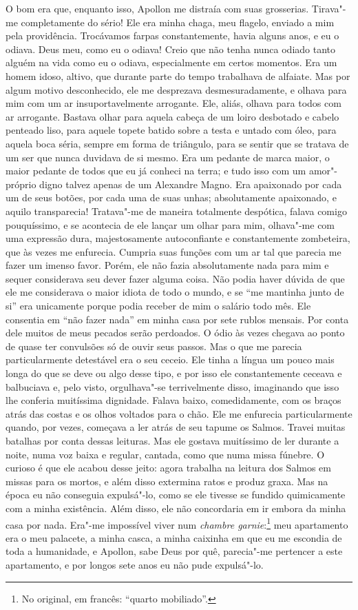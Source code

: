 O bom era que, enquanto isso, Apollon me distraía com suas grosserias.
Tirava"-me completamente do sério! Ele era minha chaga, meu flagelo,
enviado a mim pela providência. Trocávamos farpas constantemente,
havia alguns anos, e eu o odiava. Deus meu, como eu o odiava! Creio que
não tenha nunca odiado tanto alguém na vida como eu o odiava,
especialmente em certos momentos. Era um homem idoso, altivo, que
durante parte do tempo trabalhava de alfaiate. Mas por algum motivo
desconhecido, ele me desprezava desmesuradamente, e olhava para mim com
um ar insuportavelmente arrogante. Ele, aliás, olhava para todos com ar
arrogante. Bastava olhar para aquela cabeça de um loiro desbotado e
cabelo penteado liso, para aquele topete batido sobre a testa e untado
com óleo, para aquela boca séria, sempre em forma de triângulo, para se
sentir que se tratava de um ser que nunca duvidava de si mesmo. Era um
pedante de marca maior, o maior pedante de todos que eu já conheci na
terra; e tudo isso com um amor"-próprio digno talvez apenas de um
Alexandre Magno. Era apaixonado por cada um de seus botões, por cada
uma de suas unhas; absolutamente apaixonado, e aquilo transparecia!
Tratava"-me de maneira totalmente despótica, falava comigo pouquíssimo,
e se acontecia de ele lançar um olhar para mim, olhava"-me com uma
expressão dura, majestosamente autoconfiante e constantemente
zombeteira, que às vezes me enfurecia. Cumpria suas funções com um ar
tal que parecia me fazer um imenso favor. Porém, ele não fazia
absolutamente nada para mim e sequer considerava seu dever fazer alguma
coisa. Não podia haver dúvida de que ele me considerava o maior idiota
de todo o mundo, e se “me mantinha junto de si” era unicamente porque
podia receber de mim o salário todo mês. Ele consentia em “não fazer
nada” em minha casa por sete rublos mensais. Por conta dele muitos de
meus pecados serão perdoados. O ódio às vezes chegava ao ponto de quase
ter convulsões só de ouvir seus passos. Mas o que me parecia
particularmente detestável era o seu ceceio. Ele tinha a língua um
pouco mais longa do que se deve ou algo desse tipo, e por isso ele
constantemente ceceava e balbuciava e, pelo visto, orgulhava"-se
terrivelmente disso, imaginando que isso lhe conferia muitíssima
dignidade. Falava baixo, comedidamente, com os braços atrás das costas
e os olhos voltados para o chão. Ele me enfurecia particularmente
quando, por vezes, começava a ler atrás de seu tapume os Salmos. Travei
muitas batalhas por conta dessas leituras. Mas ele gostava muitíssimo
de ler durante a noite, numa voz baixa e regular, cantada, como que
numa missa fúnebre. O curioso é que ele acabou desse jeito: agora
trabalha na leitura dos Salmos em missas para os mortos, e além disso
extermina ratos e produz graxa. Mas na época eu não conseguia
expulsá"-lo, como se ele tivesse se fundido quimicamente com a minha
existência. Além disso, ele não concordaria em ir embora da minha casa
por nada. Era"-me impossível viver num \textit{chambre
garnie}:\footnote{ No original, em francês: “quarto
mobiliado”.} meu apartamento era o meu palacete, a minha casca, a minha
caixinha em que eu me escondia de toda a humanidade, e Apollon, sabe
Deus por quê, parecia"-me pertencer a este apartamento, e por longos
sete anos eu não pude expulsá"-lo.

